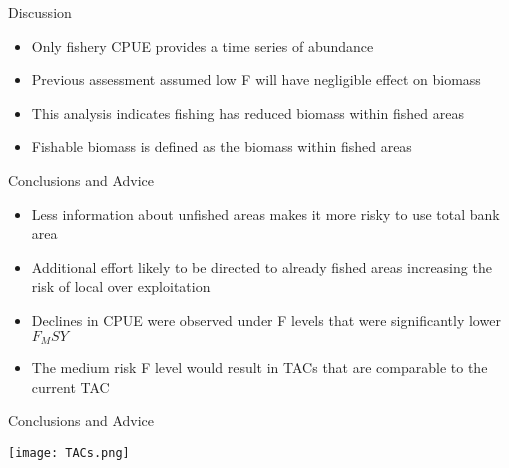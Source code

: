 \documentclass{beamer}
\begin{document}
\begin{frame}{Discussion}

\begin{itemize}
    \item Only fishery CPUE provides a time series of abundance
    \item Previous assessment assumed low F will have negligible effect on biomass 
    \item This analysis indicates fishing has reduced biomass within fished areas
    \item Fishable biomass is defined as the biomass within fished areas 
\end{itemize}

\end{frame}
 

 
\begin{frame}{Conclusions and Advice}
\centering
{}

\begin{itemize}
    \item Less information about unfished areas makes it more risky to use total bank area
    \item Additional effort likely to be directed to already fished areas increasing the risk of local over exploitation
    \item Declines in CPUE were observed under F levels that were significantly lower $F_MSY$
    \item The medium risk F level would result in TACs that are comparable to the current TAC 
\end{itemize}


\end{frame}
 
\begin{frame}{Conclusions and Advice}
        \begin{center}
            \texttt{[image: TACs.png]}
        \end{center}

\end{frame}
 
\end{document}
